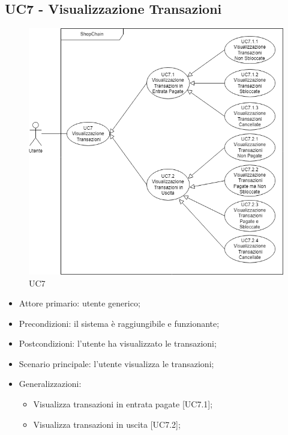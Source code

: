 \subsection{UC7 - Visualizzazione Transazioni}

\begin{figure}[H]
    \centering
    \includegraphics[scale=0.7]{immagini/UC7.png}
    \caption{UC7}
\end{figure}

\begin{itemize}
    \item Attore primario: utente generico;
    \item Precondizioni: il sistema è raggiungibile e funzionante;
    \item Postcondizioni: l'utente ha visualizzato le transazioni;
    \item Scenario principale: l'utente visualizza le transazioni;
    \item Generalizzazioni:
          \begin{itemize}
              \item Visualizza transazioni in entrata pagate [UC7.1];
              \item Visualizza transazioni in uscita [UC7.2];
          \end{itemize}
\end{itemize}

